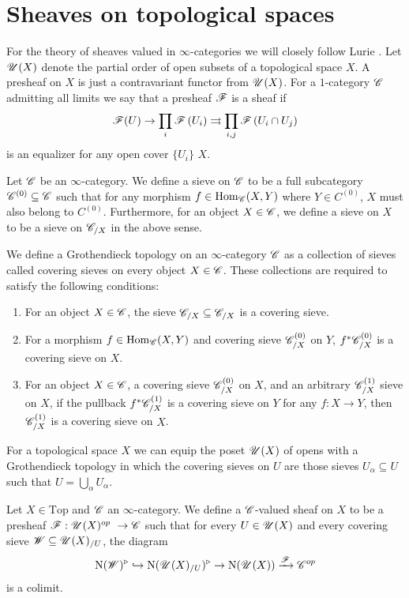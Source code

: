 \documentclass[../../thesis.tex]{subfiles}
\begin{document}
\section{Sheaves on topological spaces}
For the theory of sheaves valued in $\infty$-categories we will closely follow Lurie \cite{HTT}.
Let $\mathscr{U}(X)$ denote the partial order of open subsets of a topological space $X$.
A presheaf on $X$ is just a contravariant functor from $\mathscr{U}(X)$.
For a $1$-category $\mathscr{C}$ admitting all limits we say that a presheaf $\mathscr{F}$ is a sheaf if
\[
    \mathscr{F}(U) \rightarrow \prod_{i} \mathscr{F}\left(U_{i}\right) \rightrightarrows \prod_{i, j} \mathscr{F}\left(U_{i} \cap U_{j}\right)
\]
is an equalizer for any open cover $\{U_i\}$ $X$.
\begin{definition}
    Let $\mathscr{C}$ be an $\infty$-category.
    We define a sieve on $\mathscr{C}$ to be a full subcategory $\mathscr{C}^{(0)} \subseteq \mathscr{C}$ such that for any morphism $f \in \mathrm{Hom}_{\mathscr{C}}(X,Y)$ where $Y\in C^{(0)}$, $X$ must also belong to $C^{(0)}$.
    Furthermore, for an object $X \in \mathscr{C}$, we define a sieve on $X$ to be a sieve on $\mathscr{C}_{/X}$ in the above sense.
\end{definition}
\begin{definition}
    We define a Grothendieck topology on an $\infty$-category $\mathscr{C}$ as a collection of sieves called covering sieves on every object $X\in \mathscr{C}$.
    These collections are required to satisfy the following conditions:
    \begin{enumerate}
        \item For an object $X\in \mathscr{C}$, the sieve $\mathscr{C}_{/X} \subseteq \mathscr{C}_{/X}$ is a covering sieve.
        \item For a morphism $f \in \mathrm{Hom}_{\mathscr{C}}(X,Y)$ and covering sieve $\mathscr{C}^{(0)}_{/X}$ on $Y$, $f^*\mathscr{C}^{(0)}_{/X}$ is a covering sieve on $X$.
        \item For an object $X \in \mathscr{C}$, a covering sieve $\mathscr{C}^{(0)}_{/X}$ on $X$, and an arbitrary  $\mathscr{C}^{(1)}_{/X}$ sieve on $X$, if the pullback $f^*\mathscr{C}^{(1)}_{/X}$ is a covering sieve on $Y$ for any $f: X \to Y$, then $\mathscr{C}^{(1)}_{/X}$ is a covering sieve on $X$.
    \end{enumerate}
\end{definition}
For a topological space $X$ we can equip the poset $\mathscr{U}(X)$ of opens with a Grothendieck topology in which the covering sieves on $U$ are those sieves $U_{\alpha} \subseteq U$ such that $U = \bigcup_{\alpha}U_{\alpha}$.
\begin{definition}\label{sheaf_on_top}
    Let $X \in \mathrm{Top}$ and $\mathscr{C}$ an $\infty$-category.
    We define a $\mathscr{C}$-valued sheaf on $X$ to be a presheaf $\F: \Open(X)^{op} \to \C$ such that for every $U\in \mathscr{U}(X)$ and every covering sieve $\mathscr{W} \subseteq \mathscr{U}(X)_{/U}$, the diagram
    \[
        \mathrm{N}(\mathscr{W})^{\triangleright} \hookrightarrow \mathrm{N}(\mathscr{U}(X)_{/U})^{\triangleright} \rightarrow \mathrm{N}(\mathscr{U}(X))\xrightarrow{\mathscr{F}}\mathscr{C}^{op}
    \]
    is a colimit.
\end{definition}
\end{document}
